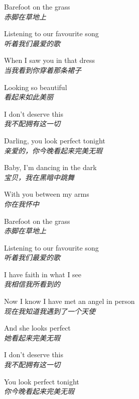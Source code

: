 \begin{spacing}{1.5}
\begin{flushleft}
Barefoot on the grass\\
\textit{赤脚在草地上}\lyricspace

Listening to our favourite song\\
\textit{听着我们最爱的歌}\lyricspace

When I saw you in that dress\\
\textit{当我看到你穿着那条裙子}\lyricspace

Looking so beautiful\\
\textit{看起来如此美丽}\lyricspace

I don't deserve this\\
\textit{我不配拥有这一切}\lyricspace

Darling, you look perfect tonight\\
\textit{亲爱的，你今晚看起来完美无瑕}\lyricspace

Baby, I'm dancing in the dark\\
\textit{宝贝，我在黑暗中跳舞}\lyricspace

With you between my arms\\
\textit{你在我怀中}\lyricspace

Barefoot on the grass\\
\textit{赤脚在草地上}\lyricspace

Listening to our favourite song\\
\textit{听着我们最爱的歌}\lyricspace

I have faith in what I see\\
\textit{我相信我所看到的}\lyricspace

Now I know I have met an angel in person\\
\textit{现在我知道我遇到了一个天使}\lyricspace

And she looks perfect\\
\textit{她看起来完美无瑕}\lyricspace

I don't deserve this\\
\textit{我不配拥有这一切}\lyricspace

You look perfect tonight\\
\textit{你今晚看起来完美无瑕}\lyricspace
\end{flushleft}
\end{spacing} 
